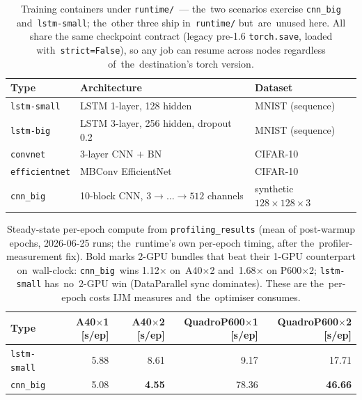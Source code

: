 \begin{table}[H]\centering\small
\begin{tabular}{l l l}\toprule
Type & Architecture & Dataset \\\midrule
\texttt{lstm-small}    & LSTM 1-layer, 128 hidden                              & MNIST (sequence)    \\
\texttt{lstm-big}      & LSTM 3-layer, 256 hidden, dropout 0.2                 & MNIST (sequence)    \\
\texttt{convnet}       & 3-layer CNN $+$ BN                                    & CIFAR-10            \\
\texttt{efficientnet}  & MBConv EfficientNet                                   & CIFAR-10            \\
\texttt{cnn\_big}      & 10-block CNN, $3{\to}\ldots{\to}512$ channels         & synthetic $128{\times}128{\times}3$ \\\bottomrule
\end{tabular}
\caption{Training containers under \texttt{runtime/}~--- the~two scenarios
exercise \texttt{cnn\_big} and~\texttt{lstm-small}; the~other three ship
in~\texttt{runtime/} but~are~unused here.  All share the same checkpoint
contract (legacy pre-1.6 \texttt{torch.save}, loaded with~\texttt{strict=False}),
so any job can resume across nodes regardless of~the~destination's torch
version.}\label{tab:e2e-types}
\end{table}

\begin{table}[H]\centering\small
\begin{tabular}{l r r r r}\toprule
Type & A40$\times$1 [s/ep] & A40$\times$2 [s/ep] & QuadroP600$\times$1 [s/ep] & QuadroP600$\times$2 [s/ep] \\\midrule
\texttt{lstm-small}    & 5.88  & 8.61 & 9.17    & 17.71           \\
\texttt{cnn\_big}      & 5.08  & \textbf{4.55} & 78.36  & \textbf{46.66} \\\bottomrule
\end{tabular}
\caption{Steady-state per-epoch compute from
\texttt{profiling\_results} (mean of post-warmup epochs, 2026-06-25 runs;
the~runtime's own per-epoch timing, after the~profiler-measurement fix).
Bold marks 2-GPU bundles that beat their 1-GPU counterpart on~wall-clock:
\texttt{cnn\_big}~wins 1.12$\times$ on~A40$\times$2 and~1.68$\times$ on
P600$\times$2; \texttt{lstm-small} has~no~2-GPU win (DataParallel sync
dominates).  These are the~per-epoch costs IJM measures and~the~optimiser
consumes.}\label{tab:e2e-bundle-costs}
\end{table}

